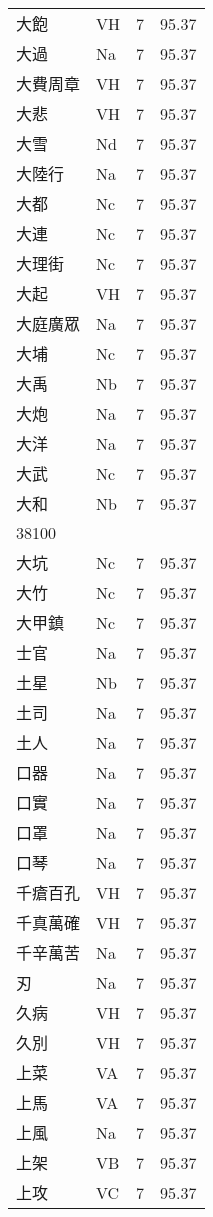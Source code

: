 \documentclass[twocolumn]{book}
\begin{document}
\begin{supertabular}{llrr}
大飽 & VH & 7 &  95.37\\
大過 & Na & 7 &  95.37\\
大費周章 & VH & 7 &  95.37\\
大悲 & VH & 7 &  95.37\\
大雪 & Nd & 7 &  95.37\\
大陸行 & Na & 7 &  95.37\\
大都 & Nc & 7 &  95.37\\
大連 & Nc & 7 &  95.37\\
大理街 & Nc & 7 &  95.37\\
大起 & VH & 7 &  95.37\\
大庭廣眾 & Na & 7 &  95.37\\
大埔 & Nc & 7 &  95.37\\
大禹 & Nb & 7 &  95.37\\
大炮 & Na & 7 &  95.37\\
大洋 & Na & 7 &  95.37\\
大武 & Nc & 7 &  95.37\\
大和 & Nb & 7 &  95.37\\
38100\\
大坑 & Nc & 7 &  95.37\\
大竹 & Nc & 7 &  95.37\\
大甲鎮 & Nc & 7 &  95.37\\
士官 & Na & 7 &  95.37\\
土星 & Nb & 7 &  95.37\\
土司 & Na & 7 &  95.37\\
土人 & Na & 7 &  95.37\\
口器 & Na & 7 &  95.37\\
口實 & Na & 7 &  95.37\\
口罩 & Na & 7 &  95.37\\
口琴 & Na & 7 &  95.37\\
千瘡百孔 & VH & 7 &  95.37\\
千真萬確 & VH & 7 &  95.37\\
千辛萬苦 & Na & 7 &  95.37\\
刃 & Na & 7 &  95.37\\
久病 & VH & 7 &  95.37\\
久別 & VH & 7 &  95.37\\
上菜 & VA & 7 &  95.37\\
上馬 & VA & 7 &  95.37\\
上風 & Na & 7 &  95.37\\
上架 & VB & 7 &  95.37\\
上攻 & VC & 7 &  95.37\\

\end{supertabular}
\end{document}
